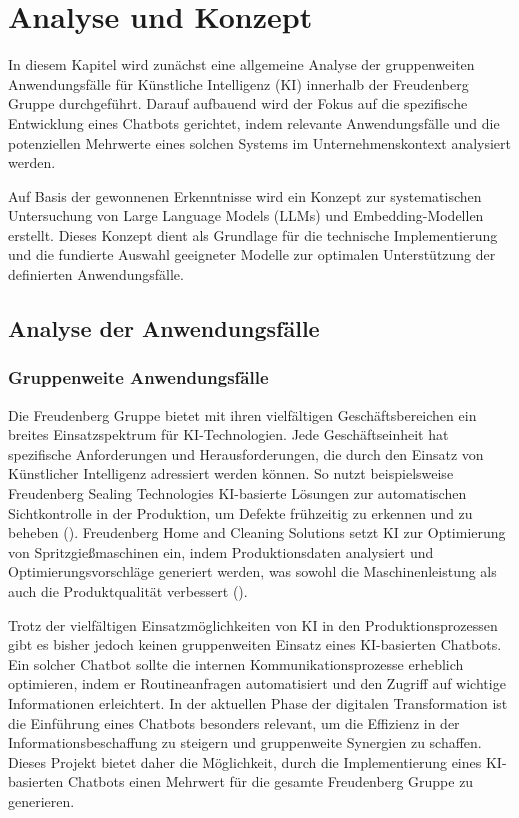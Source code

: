 \chapter{Analyse und Konzept}
\label{analyse}
\nocite{*}

In diesem Kapitel wird zunächst eine allgemeine Analyse der gruppenweiten Anwendungsfälle für Künstliche Intelligenz (\ac{KI}) innerhalb der Freudenberg Gruppe durchgeführt. 
Darauf aufbauend wird der Fokus auf die spezifische Entwicklung eines Chatbots gerichtet, indem relevante Anwendungsfälle und die potenziellen Mehrwerte eines solchen Systems im Unternehmenskontext analysiert werden.

Auf Basis der gewonnenen Erkenntnisse wird ein Konzept zur systematischen Untersuchung von Large Language Models (\acp{LLM}) und Embedding-Modellen erstellt. 
Dieses Konzept dient als Grundlage für die technische Implementierung und die fundierte Auswahl geeigneter Modelle zur optimalen Unterstützung der definierten Anwendungsfälle.

\section{Analyse der Anwendungsfälle}
\subsection{Gruppenweite Anwendungsfälle}

Die Freudenberg Gruppe bietet mit ihren vielfältigen Geschäftsbereichen ein breites Einsatzspektrum für \ac{KI}-Technologien. 
Jede Geschäftseinheit hat spezifische Anforderungen und Herausforderungen, die durch den Einsatz von Künstlicher Intelligenz adressiert werden können. 
So nutzt beispielsweise Freudenberg Sealing Technologies \ac{KI}-basierte Lösungen zur automatischen Sichtkontrolle in der Produktion, um Defekte frühzeitig zu erkennen und zu beheben (\cite{FST_Magazin_KI}). 
Freudenberg Home and Cleaning Solutions setzt \ac{KI} zur Optimierung von Spritzgießmaschinen ein, indem Produktionsdaten analysiert und Optimierungsvorschläge generiert werden, 
was sowohl die Maschinenleistung als auch die Produktqualität verbessert (\cite{Spritzgießen_4.0}).

Trotz der vielfältigen Einsatzmöglichkeiten von \ac{KI} in den Produktionsprozessen gibt es bisher jedoch keinen gruppenweiten Einsatz eines \ac{KI}-basierten Chatbots. 
Ein solcher Chatbot sollte die internen Kommunikationsprozesse erheblich optimieren, indem er Routineanfragen automatisiert und den Zugriff auf wichtige Informationen erleichtert. 
In der aktuellen Phase der digitalen Transformation ist die Einführung eines Chatbots besonders relevant, um die Effizienz in der Informationsbeschaffung zu steigern und gruppenweite Synergien zu schaffen. 
Dieses Projekt bietet daher die Möglichkeit, durch die Implementierung eines \ac{KI}-basierten Chatbots einen Mehrwert für die gesamte Freudenberg Gruppe zu generieren.


